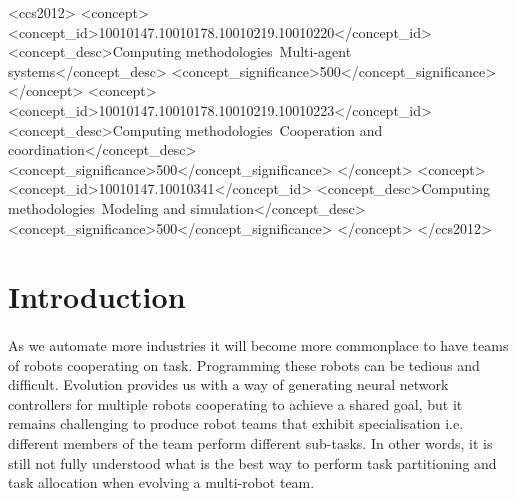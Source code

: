 \documentclass[sigconf]{aamas}  %
\begin{document}
\begin{CCSXML}
<ccs2012>
<concept>
<concept_id>10010147.10010178.10010219.10010220</concept_id>
<concept_desc>Computing methodologies~Multi-agent systems</concept_desc>
<concept_significance>500</concept_significance>
</concept>
<concept>
<concept_id>10010147.10010178.10010219.10010223</concept_id>
<concept_desc>Computing methodologies~Cooperation and coordination</concept_desc>
<concept_significance>500</concept_significance>
</concept>
<concept>
<concept_id>10010147.10010341</concept_id>
<concept_desc>Computing methodologies~Modeling and simulation</concept_desc>
<concept_significance>500</concept_significance>
</concept>
</ccs2012>
\end{CCSXML}




\maketitle



\section{Introduction}

\paragraph{}
As we automate more industries it will become more commonplace to have teams of robots cooperating on task. Programming these robots can be tedious and difficult. Evolution provides us with a way of generating neural network controllers for multiple robots cooperating to achieve a shared goal, but it remains challenging to produce robot teams that exhibit specialisation i.e. different members of the team perform different sub-tasks. In other words, it is still not fully understood what is the best way to perform task partitioning and task allocation when evolving a multi-robot team.
\end{document}
